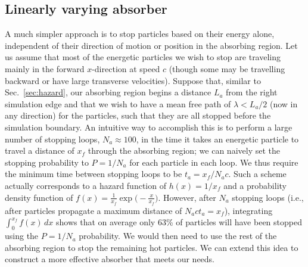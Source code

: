 \documentclass[../absorber.tex]{subfiles}
\begin{document}

\subsection{Linearly varying absorber} \label{sec:linear}

A much simpler approach is to stop particles based on their energy alone, independent of their direction of motion or position in the absorbing region.  Let us assume that most of the energetic particles we wish to stop are traveling mainly in the forward $x$-direction at speed $c$ (though some may be travelling backward or have large transverse velocities).  Suppose that, similar to Sec.~\ref{sec:hazard}, our absorbing region begins a distance $L_a$ from the right simulation edge and that we wish to have a mean free path of $\lambda<L_a/2$ (now in any direction) for the particles, such that they are all stopped before the simulation boundary.  An intuitive way to accomplish this is to perform a large number of stopping loops, $N_a \approx 100$, in the time it takes an energetic particle to travel a distance of $x_f$ through the absorbing region; we can naively set the stopping probability to $P = 1/N_a$ for each particle in each loop.  We thus require the minimum time between stopping loops to be $t_a = x_f/N_a c$.
Such a scheme actually corresponds to a hazard function of $h(x)=1/x_f$ and a probability density function of $f(x)=\frac{1}{x_f} \exp \big( -\frac{x}{x_f} \big)$.  However, after $N_a$ stopping loops (i.e., after particles propagate a maximum distance of $N_a c t_a = x_f$), integrating $\int_0^{x_f} f(x)\,dx$ shows that on average only 63\% of particles will have been stopped using the $P=1/N_a$ probability.  We would then need to use the rest of the absorbing region to stop the remaining hot particles.  We can extend this idea to construct a more effective absorber that meets our needs.
\end{document}
